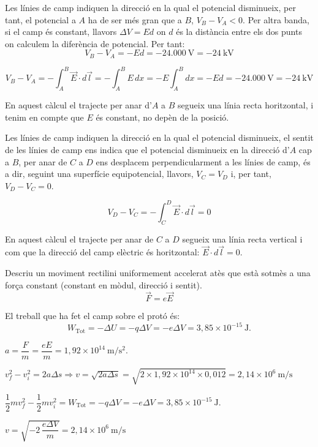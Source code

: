 \begin{solapartat}
 Les línies de camp indiquen la direcció en la qual el potencial disminueix,
per tant, el potencial a $A$ ha de ser més gran que a $B$, $V_B - V_A < 0$. Per altra
banda, si el camp és constant, llavors $\Delta V = Ed$ on $d$ és la distància entre els
dos punts on calculem la diferència de potencial. Per tant:
\[ V_B - V_A = -Ed = -24.000\ \mathrm{V} = -24\ \mathrm{kV} \]

\[ V_B - V_A = -\int_A^B \vec{E}\cdot d\vec{l} = -\int_A^B E\,dx = -E\int_A^B dx = -Ed = -24.000\ \mathrm{V} = -24\ \mathrm{kV} \]

En aquest càlcul el trajecte per anar d'$A$ a $B$ segueix una línia recta horitzontal, i
tenim en compte que $E$ és constant, no depèn de la posició.

 Les línies de camp indiquen la direcció en la qual el potencial disminueix, el
sentit de les línies de camp ens indica que el potencial disminueix en la direcció d'$A$
cap a $B$, per anar de $C$ a $D$ ens desplacem perpendicularment a les línies de camp, és
a dir, seguint una superfície equipotencial, llavors, $V_C = V_D$ i, per tant,
$V_D - V_C = 0$.

\[ V_D - V_C = -\int_C^D \vec{E}\cdot d\vec{l} = 0 \]

En aquest càlcul el trajecte per anar de $C$ a $D$ segueix una línia recta vertical i com
que la direcció del camp elèctric és horitzontal: $\vec{E}\cdot d\vec{l} = 0$.
\end{solapartat}

\begin{solapartat}
 Descriu un moviment rectilini uniformement accelerat atès que està sotmès a
una força constant (constant en mòdul, direcció i sentit).
\[ \vec{F} = e\vec{E} \]

 El treball que ha fet el camp sobre el protó és:
\[ W_\mathrm{Tot} = -\Delta U = -q\Delta V = -e\Delta V = 3,85\times 10^{-15}\ \mathrm{J}. \]


 $a = \dfrac{F}{m} = \dfrac{eE}{m} = 1,92\times 10^{14}\ \mathrm{m/s^2}$.

 $v_f^2 - v_i^2 = 2a\Delta s \Rightarrow v = \sqrt{2a\Delta s} = \sqrt{2\times 1,92\times 10^{14}\times 0,012} = 2,14\times 10^{6}\ \mathrm{m/s}$


 $\dfrac{1}{2}mv_f^2 - \dfrac{1}{2}mv_i^2 = W_\mathrm{Tot} = -q\Delta V = -e\Delta V = 3,85\times 10^{-15}\ \mathrm{J}.$

 $v = \sqrt{-2\,\dfrac{e\Delta V}{m}} = 2,14\times 10^{6}\ \mathrm{m/s}$
\end{solapartat}

